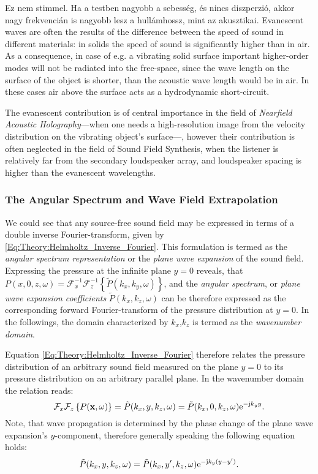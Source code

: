 {\color{red}Ez nem stimmel. Ha a testben nagyobb a sebesség, és nincs diszperzió, akkor nagy frekvencián is nagyobb lesz a hullámhossz, mint az akusztikai.
Evanescent waves are often the results of the difference between the speed of sound in different materials: in solids the speed of sound is significantly higher than in air. As a consequence, in case of e.g. a vibrating solid surface important higher-order modes will not be radiated into the free-space, since the wave length on the surface of the object is shorter, than the acoustic wave length would be in air. In these cases air above the surface acts as a hydrodynamic short-circuit.}

The evanescent contribution is of central importance in the field of \emph{Nearfield Acoustic Holography}---when one needs a high-resolution image from the velocity distribution on the vibrating object's surface---, however their contribution is often neglected in the field of Sound Field Synthesis, when the listener is relatively far from the secondary loudspeaker array, and loudspeaker spacing is higher than the evanescent wavelengths.


\subsubsection{The Angular Spectrum and Wave Field Extrapolation}
We could see that any source-free sound field may be expressed in terms of a double inverse Fourier-transform, given by \eqref{Eq:Theory:Helmholtz_Inverse_Fourier}.
This formulation is termed as the \emph{angular spectrum representation} \cite{Ahrens2010phd, Ahrens2012, Williams1999} or the \emph{plane wave expansion} \cite{Spors2005} of the sound field.
Expressing the pressure at the infinite plane $y=0$ reveals, that $P(x,0,z,\omega) = \mathcal{F}_x^{-1}\mathcal{F}_z^{-1} \left\{\tilde{P}(k_x,k_y, \omega)\right\}$,
and the \emph{angular spectrum}, or \emph{plane wave expansion coefficients} $\tilde{P}(k_x,k_z, \omega)$ can be therefore expressed as the corresponding forward Fourier-transform of the pressure distribution at $y=0$.%
In the followings, the domain characterized by $k_x$,$k_z$ is termed as the \emph{wavenumber domain}.

Equation \eqref{Eq:Theory:Helmholtz_Inverse_Fourier} therefore relates the pressure distribution of an arbitrary sound field measured on the plane $y=0$ to its pressure distribution on an arbitrary parallel plane. In the wavenumber domain the relation reads:
\begin{equation}
\mathcal{F}_x\mathcal{F}_z \left\{ P(\mathbf{x},\omega) \right\} = \tilde{P}(k_x,y,k_z,\omega) = \tilde{P}(k_x,0,k_z,\omega) \mathrm{e}^{-\mathrm{j} k_y y}.
\label{Eq:Theory:Wave_field_extrapolation}
\end{equation}
Note, that wave propagation is determined by the phase change of the plane wave expansion's $y$-component, therefore generally speaking the following equation holds:
\begin{equation}
\tilde{P}(k_x,y,k_z,\omega) = \tilde{P}(k_x,y',k_z,\omega) \mathrm{e}^{-\mathrm{j} k_y ( y - y' ) }.
\end{equation}

